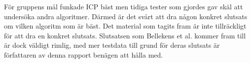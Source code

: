 För gruppens mål funkade ICP bäst men tidiga tester som gjordes gav skäl att undersöka andra algoritmer. Därmed är det svårt att dra någon konkret slutsats om vilken algoritm som är bäst. Det material som tagits fram är inte tillräckligt för att dra en konkret slutsats. Slutsatsen som Bellekens et al. \cite{beller2014modern} kommer fram till är dock väldigt rimlig, med mer testdata till grund för deras slutsats är författaren av denna rapport benägen att hålla med.



